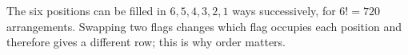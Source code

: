 The six positions can be filled in $6,5,4,3,2,1$ ways successively, for $6!=\boxed{720}$ arrangements. Swapping two flags changes which flag occupies each position and therefore gives a different row; this is why order matters.
